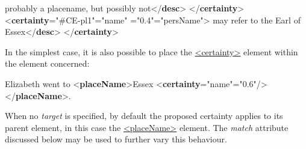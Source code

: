 \begin{shaded}
probably a placename, but possibly not{</\textbf{desc}>}\mbox{}\newline 
{</\textbf{certainty}>}\mbox{}\newline 
{<\textbf{certainty}\hspace*{1em}{target}="{\#CE-pl1}"\hspace*{1em}{locus}="{name}"\mbox{}\newline 
\hspace*{1em}{degree}="{0.4}"\hspace*{1em}{assertedValue}="{persName}">}\mbox{}\newline 
{}may refer to the Earl of Essex{</\textbf{desc}>}\mbox{}\newline 
{</\textbf{certainty}>}\end{shaded}\egroup\par \par
In the simplest case, it is also possible to place the \hyperref[TEI.certainty]{<certainty>} element within the element concerned: \par\bgroup{}\exampleFont \begin{shaded}\noindent\mbox{}Elizabeth went to\mbox{}\newline 
{<\textbf{placeName}>}Essex\mbox{}\newline 
{<\textbf{certainty}\hspace*{1em}{locus}="{name}"\hspace*{1em}{degree}="{0.6}"/>}\mbox{}\newline 
{</\textbf{placeName}>}.\end{shaded}\egroup\par \noindent  When no {\itshape target} is specified, by default the proposed certainty applies to its parent element, in this case the \hyperref[TEI.placeName]{<placeName>} element. The {\itshape match} attribute discussed below may be used to further vary this behaviour.
